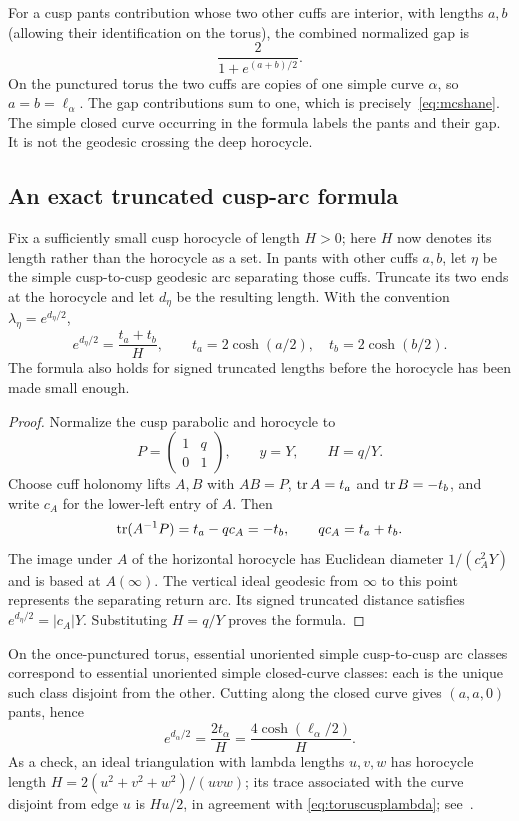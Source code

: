 For a cusp pants contribution whose two other cuffs are interior, with
lengths $a,b$ (allowing their identification on the torus), the combined
normalized gap is
\begin{equation}
 \frac{2}{1+e^{(a+b)/2}}.
 \label{eq:cuspgap}
\end{equation}
On the punctured torus the two cuffs are copies of one simple curve
$\alpha$, so $a=b=\ell_\alpha$. The gap contributions sum to one,
which is precisely~\eqref{eq:mcshane}. The simple closed curve occurring
in the formula labels the pants and their gap. It is not the geodesic
crossing the deep horocycle.

\subsection{An exact truncated cusp-arc formula}

Fix a sufficiently small cusp horocycle of length $H>0$; here $H$ now
denotes its length rather than the horocycle as a set. In pants with other
cuffs $a,b$, let $\eta$ be the simple cusp-to-cusp geodesic arc separating
those cuffs. Truncate its two ends at the horocycle and let $d_\eta$ be
the resulting length. With the convention $\lambda_\eta=e^{d_\eta/2}$,
\begin{equation}
 \boxed{e^{d_\eta/2}=\frac{t_a+t_b}{H},
        \qquad t_a=2\cosh(a/2),\quad t_b=2\cosh(b/2).}
 \label{eq:cusplambda}
\end{equation}
The formula also holds for signed truncated lengths before the horocycle
has been made small enough.

\begin{proof}
Normalize the cusp parabolic and horocycle to
\[
 P=\begin{pmatrix}1&q\\0&1\end{pmatrix},\qquad y=Y,
 \qquad H=q/Y.
\]
Choose cuff holonomy lifts $A,B$ with $AB=P$, $\operatorname{tr} A=t_a$ and
$\operatorname{tr} B=-t_b$, and write $c_A$ for the lower-left entry of $A$. Then
\[
 \operatorname{tr}(A^{-1}P)=t_a-qc_A=-t_b,
 \qquad qc_A=t_a+t_b.
\]
The image under $A$ of the horizontal horocycle has Euclidean diameter
$1/(c_A^2Y)$ and is based at $A(\infty)$. The vertical ideal geodesic
from $\infty$ to this point represents the separating return arc.
Its signed truncated distance satisfies
$e^{d_\eta/2}=|c_A|Y$. Substituting $H=q/Y$ proves the formula.
\end{proof}

On the once-punctured torus, essential unoriented simple cusp-to-cusp arc
classes correspond to essential unoriented simple closed-curve classes:
each is the unique such class disjoint from the other. Cutting along the
closed curve gives $(a,a,0)$ pants, hence
\begin{equation}
 e^{d_\alpha/2}=\frac{2t_\alpha}{H}
              =\frac{4\cosh(\ell_\alpha/2)}{H}.
 \label{eq:toruscusplambda}
\end{equation}
As a check, an ideal triangulation with lambda lengths $u,v,w$ has
horocycle length $H=2(u^2+v^2+w^2)/(uvw)$; its trace associated with the
curve disjoint from edge $u$ is $Hu/2$, in agreement with
\eqref{eq:toruscusplambda}; see~\cite[Section 12]{Springborn}.

